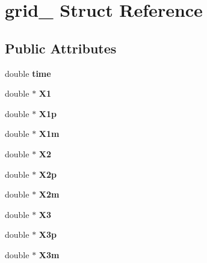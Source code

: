 \hypertarget{structgrid__}{}\section{grid\+\_\+ Struct Reference}
\label{structgrid__}
\subsection*{Public Attributes}
\begin{DoxyCompactItemize}
\item 
\mbox{\label{structgrid___a36e01b8282b3fb0a5647c601752af4d8}} 
double {\bfseries time}
\item 
\mbox{\label{structgrid___a2097cb01c2f274ef8f67c8a4af5145a4}} 
double $\ast$ {\bfseries X1}
\item 
\mbox{\label{structgrid___a66b77e5a7372a64059fccef68e9982ea}} 
double $\ast$ {\bfseries X1p}
\item 
\mbox{\label{structgrid___ad53f909daa682ef347696063e7d60d4f}} 
double $\ast$ {\bfseries X1m}
\item 
\mbox{\label{structgrid___a82d7e83070920727aac5f2443c0ce308}} 
double $\ast$ {\bfseries X2}
\item 
\mbox{\label{structgrid___ab2e85aab6e845cccc2b6379c5715d326}} 
double $\ast$ {\bfseries X2p}
\item 
\mbox{\label{structgrid___a885871bd964ac8adc8c8d18ff3f2b78a}} 
double $\ast$ {\bfseries X2m}
\item 
\mbox{\label{structgrid___a73ac4c81b076c3755ae95503ceebd89f}} 
double $\ast$ {\bfseries X3}
\item 
\mbox{\label{structgrid___aa524e815b9ec19dbd9d1e8908edc5484}} 
double $\ast$ {\bfseries X3p}
\item 
\mbox{\label{structgrid___a2cbf50895bdf7cbc32e9d428ef2195f4}} 
double $\ast$ {\bfseries X3m}
\item 
\mbox{\label{structgrid___aeefa72e863cfef36bd44af3197c249c7}} 

\end{DoxyCompactItemize}
